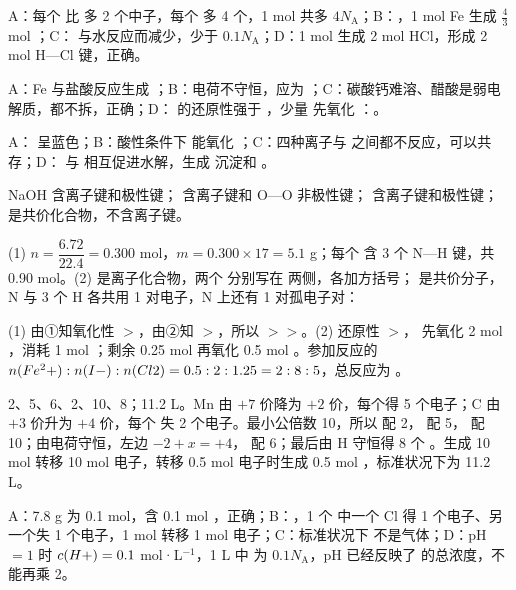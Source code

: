 \begin{jiexilist}
\item {}A：每个  比  多 2 个中子，每个  多 4 个，1 mol 共多 $4N_\text{A}$；B：，1 mol Fe 生成 $\frac43$ mol ；C： 与水反应而减少，少于 $0.1N_\text{A}$；D：1 mol  生成 2 mol HCl，形成 2 mol H—Cl 键，正确。
\item {}A：Fe 与盐酸反应生成 ；B：电荷不守恒，应为 ；C：碳酸钙难溶、醋酸是弱电解质，都不拆，正确；D： 的还原性强于 ，少量  先氧化 ：。
\item {}A： 呈蓝色；B：酸性条件下  能氧化 ；C：四种离子与  之间都不反应，可以共存；D： 与  相互促进水解，生成  沉淀和 。
\item {}NaOH 含离子键和极性键； 含离子键和 O—O 非极性键； 含离子键和极性键； 是共价化合物，不含离子键。
\item (1) $n=\dfrac{6.72}{22.4}=0.300$ mol，$m=0.300\times17=5.1$ g；每个  含 3 个 N—H 键，共 0.90 mol。(2)  是离子化合物，两个  分别写在  两侧，各加方括号； 是共价分子，N 与 3 个 H 各共用 1 对电子，N 上还有 1 对孤电子对：\\[2pt]
\item (1) 由①知氧化性 $>$，由②知 $>$，所以 $>$$>$。(2) 还原性 $>$， 先氧化 2 mol ，消耗 1 mol ；剩余 0.25 mol  再氧化 0.5 mol 。参加反应的 $n(Fe^2+):n(I-):n(Cl2)=0.5:2:1.25=2:8:5$，总反应为 。
\item 2、5、6、2、10、8；11.2 L。Mn 由 $+7$ 价降为 $+2$ 价，每个得 5 个电子；C 由 $+3$ 价升为 $+4$ 价，每个  失 2 个电子。最小公倍数 10，所以  配 2， 配 5， 配 10；由电荷守恒，左边 $-2+x=+4$， 配 6；最后由 H 守恒得 8 个 。生成 10 mol  转移 10 mol 电子，转移 0.5 mol 电子时生成 0.5 mol ，标准状况下为 11.2 L。
\item {}A：7.8 g  为 0.1 mol，含 0.1 mol ，正确；B：，1 个  中一个 Cl 得 1 个电子、另一个失 1 个电子，1 mol  转移 1 mol 电子；C：标准状况下  不是气体；D：pH$=1$ 时 $c(H+)=0.1$ mol·L$^{-1}$，1 L 中  为 $0.1N_\text{A}$，pH 已经反映了  的总浓度，不能再乘 2。
\end{jiexilist}
